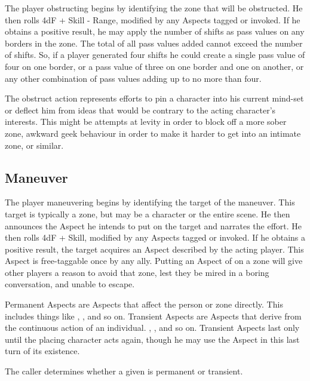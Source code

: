 The player obstructing begins by identifying the zone that will be obstructed. He then rolls 4dF + Skill - Range, modified by any Aspects tagged or invoked. If he obtains a positive result, he may apply the number of shifts as pass values on any borders in the zone. The total of all pass values added cannot exceed the number of shifts. So, if a player generated four shifts he could create a single pass value of four on one border, or a pass value of three on one border and one on another, or any other combination of pass values adding up to no more than four.

The obstruct action represents efforts to pin a character into his current mind-set or deflect him from ideas that would be contrary to the acting character's interests. This might be attempts at levity in order to block off a more sober zone, awkward geek behaviour in order to make it harder to get into an intimate zone, or similar.


\subsection{Maneuver}\label{sec:Maneuver}

The player maneuvering begins by identifying the target of the maneuver. This target is typically a zone, but may be a character or the entire scene. He then announces the Aspect he intends to put on  the target and narrates the effort. He then rolls 4dF + Skill, modified by any Aspects tagged or invoked. If he obtains a positive result, the target acquires an Aspect described by the acting player. This Aspect is free-taggable once by any ally. Putting an Aspect of  on a zone will give other players a reason to avoid that zone, lest they be mired in a boring conversation, and unable to escape.

Permanent Aspects are Aspects that affect the person or zone directly. This includes things like , , and so on. Transient Aspects are Aspects that derive from the continuous action of an individual. , , and so on. Transient Aspects last only until the placing character acts again, though he may use the Aspect in this last turn of its existence.

The caller determines whether a given \Aspect{} is permanent or transient.


